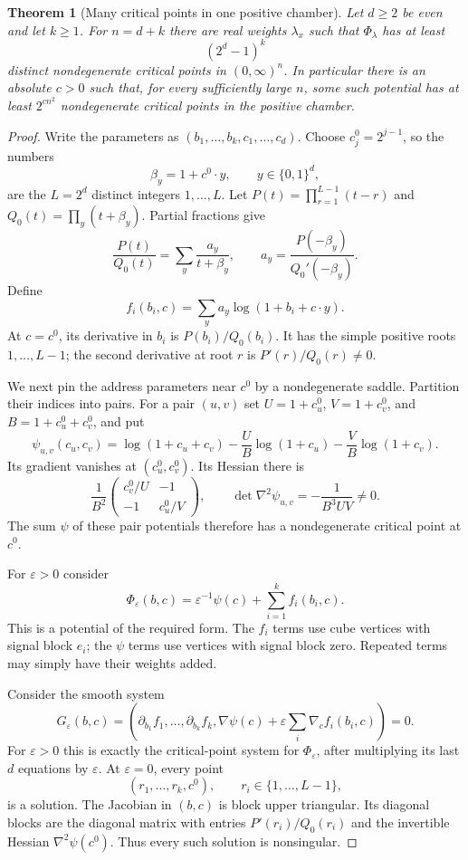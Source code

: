 \documentclass[11pt]{article}
\newtheorem{theorem}[proposition]{Theorem}
\begin{document}
\begin{theorem}[Many critical points in one positive chamber]
Let $d\geq2$ be even and let $k\geq1$. For $n=d+k$ there are real weights
$\lambda_x$ such that $\Phi_\lambda$ has at least
\[
                  (2^d-1)^k
\]
distinct nondegenerate critical points in $(0,\infty)^n$.
In particular there is an absolute $c>0$ such that, for every sufficiently
large $n$, some such potential has at least $2^{c n^2}$ nondegenerate
critical points in the positive chamber.
\end{theorem}
\begin{proof}
Write the parameters as $(b_1,\ldots,b_k,c_1,\ldots,c_d)$.
Choose $c^0_j=2^{j-1}$, so the numbers
\[
       \beta_y=1+c^0\cdot y,\qquad y\in\{0,1\}^d,
\]
are the $L=2^d$ distinct integers $1,\ldots,L$.
Let $P(t)=\prod_{r=1}^{L-1}(t-r)$ and
$Q_0(t)=\prod_y(t+\beta_y)$. Partial fractions give
\[
 \frac{P(t)}{Q_0(t)}=\sum_y\frac{a_y}{t+\beta_y},
 \qquad
 a_y=\frac{P(-\beta_y)}{Q_0'(-\beta_y)}.
\]
Define
\[
 f_i(b_i,c)=\sum_y a_y\log(1+b_i+c\cdot y).
\]
At $c=c^0$, its derivative in $b_i$ is $P(b_i)/Q_0(b_i)$.
It has the simple positive roots $1,\ldots,L-1$; the second derivative at
root $r$ is $P'(r)/Q_0(r)\neq0$.

We next pin the address parameters near $c^0$ by a nondegenerate saddle.
Partition their indices into pairs. For a pair $(u,v)$ set
$U=1+c^0_u$, $V=1+c^0_v$, and $B=1+c^0_u+c^0_v$, and put
\[
 \psi_{u,v}(c_u,c_v)=\log(1+c_u+c_v)
       -\frac{U}{B}\log(1+c_u)-\frac{V}{B}\log(1+c_v).
\]
Its gradient vanishes at $(c^0_u,c^0_v)$. Its Hessian there is
\[
 \frac1{B^2}
 \begin{pmatrix}c^0_v/U&-1\\-1&c^0_u/V\end{pmatrix},
 \qquad
 \det\nabla^2\psi_{u,v}=-\frac1{B^3UV}\neq0.
\]
The sum $\psi$ of these pair potentials therefore has a nondegenerate
critical point at $c^0$.

For $\varepsilon>0$ consider
\[
 \Phi_\varepsilon(b,c)=\varepsilon^{-1}\psi(c)
                       +\sum_{i=1}^k f_i(b_i,c).
\]
This is a potential of the required form. The $f_i$ terms use cube
vertices with signal block $e_i$; the $\psi$ terms use vertices with
signal block zero. Repeated terms may simply have their weights added.

Consider the smooth system
\[
 G_\varepsilon(b,c)=
 \left(\partial_{b_1}f_1,\ldots,\partial_{b_k}f_k,
       \nabla\psi(c)+\varepsilon\sum_i\nabla_c f_i(b_i,c)\right)=0.
\]
For $\varepsilon>0$ this is exactly the critical-point system for
$\Phi_\varepsilon$, after multiplying its last $d$ equations by
$\varepsilon$. At $\varepsilon=0$, every point
\[
       (r_1,\ldots,r_k,c^0),\qquad r_i\in\{1,\ldots,L-1\},
\]
is a solution. The Jacobian in $(b,c)$ is block upper triangular.
Its diagonal blocks are the diagonal matrix with entries
$P'(r_i)/Q_0(r_i)$ and the invertible Hessian $\nabla^2\psi(c^0)$.
Thus every such solution is nonsingular.


\end{proof}
\end{document}

